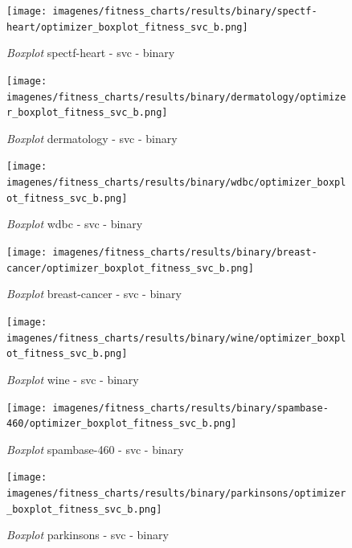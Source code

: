 \begin{figure}[htp]
    \centering
    \texttt{[image: imagenes/fitness\_charts/results/binary/spectf-heart/optimizer\_boxplot\_fitness\_svc\_b.png]}
    \caption{\textit{Boxplot} spectf-heart - svc - binary}

\end{figure}

\begin{figure}[htp]
    \centering
    \texttt{[image: imagenes/fitness\_charts/results/binary/dermatology/optimizer\_boxplot\_fitness\_svc\_b.png]}
    \caption{\textit{Boxplot} dermatology - svc - binary}

\end{figure}

\begin{figure}[htp]
    \centering
    \texttt{[image: imagenes/fitness\_charts/results/binary/wdbc/optimizer\_boxplot\_fitness\_svc\_b.png]}
    \caption{\textit{Boxplot} wdbc - svc - binary}

\end{figure}

\begin{figure}[htp]
    \centering
    \texttt{[image: imagenes/fitness\_charts/results/binary/breast-cancer/optimizer\_boxplot\_fitness\_svc\_b.png]}
    \caption{\textit{Boxplot} breast-cancer - svc - binary}

\end{figure}

\begin{figure}[htp]
    \centering
    \texttt{[image: imagenes/fitness\_charts/results/binary/wine/optimizer\_boxplot\_fitness\_svc\_b.png]}
    \caption{\textit{Boxplot} wine - svc - binary}

\end{figure}

\begin{figure}[htp]
    \centering
    \texttt{[image: imagenes/fitness\_charts/results/binary/spambase-460/optimizer\_boxplot\_fitness\_svc\_b.png]}
    \caption{\textit{Boxplot} spambase-460 - svc - binary}

\end{figure}

\begin{figure}[htp]
    \centering
    \texttt{[image: imagenes/fitness\_charts/results/binary/parkinsons/optimizer\_boxplot\_fitness\_svc\_b.png]}
    \caption{\textit{Boxplot} parkinsons - svc - binary}

\end{figure}

